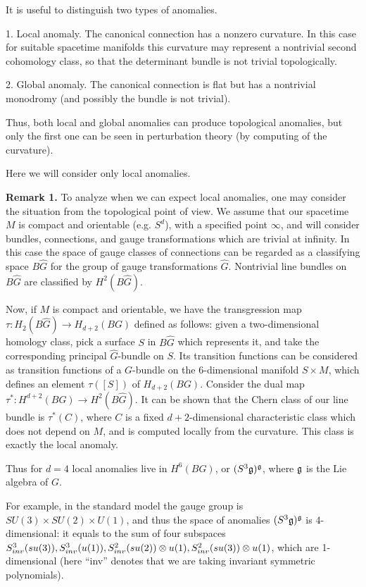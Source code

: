 It is useful to distinguish two types of anomalies. 

1. Local anomaly. The canonical connection has a nonzero curvature. 
In this case for suitable spacetime manifolds this curvature  
may represent a nontrivial second cohomology class, so that the determinant 
bundle is not trivial topologically.  

2. Global anomaly. The canonical connection is flat but 
has a nontrivial monodromy (and possibly the bundle is not trivial).

Thus, both local and global anomalies can produce topological anomalies, 
but only the first one can be seen in perturbation theory (by computing 
of the curvature). 

Here we will consider only local anomalies. 

{\bf Remark 1.} To analyze when we can expect local anomalies,
one may consider the situation from the topological point of view.
We assume that our spacetime $M$ is compact and orientable (e.g. $S^d$),
with a specified point $\infty$, and will consider bundles, connections, and 
gauge transformations which are trivial at infinity.      
In this case the space of  gauge classes of connections can be regarded as 
a classifying space $B\hat G$ for the group of gauge transformations $\hat G$. 
Nontrivial line bundles on $B\hat G$ are classified by 
$H^2(B\hat G)$. 
  
Now, if $M$ is compact and orientable, we have the transgression 
 map $\tau:H_2(B\hat G)\to H_{d+2}(BG)$ defined 
as follows: given a two-dimensional homology class, pick 
a surface $S$ in $B\hat G$ which represents it, and take the 
corresponding principal $\hat G$-bundle on $S$. Its transition functions 
can be considered as transition functions of a $G$-bundle on 
the 6-dimensional manifold $S\times M$, which defines 
an element $\tau([S])$ of $H_{d+2}(BG)$. Consider the dual map 
$\tau^*: H^{d+2}(BG)\to H^2(B\hat G)$. It can be shown that the Chern class 
of our line bundle is $\tau^*(C)$, where $C$ is a fixed 
$d+2$-dimensional characteristic class which does not depend on $M$, and 
is computed locally from the curvature. This class is exactly the local 
anomaly.  

Thus for $d=4$ local anomalies live in 
$H^6(BG)$, or $(S^3\frak g)^\frak g$, where $\frak g$ is the Lie algebra of $G$. 

For example, in the standard model the gauge group is 
$SU(3)\times SU(2)\times U(1)$, and thus the space of anomalies
$(S^3\frak g)^\frak g$ is 4-dimensional: it equals to the sum 
of four subspaces $S_{inv}^3(su(3)),S_{inv}^3(u(1)),
S_{inv}^2(su(2))\otimes u(1), S_{inv}^2(su(3))\otimes u(1)$, which are 1-dimensional
(here ``inv'' denotes that we are taking invariant symmetric polynomials).    

